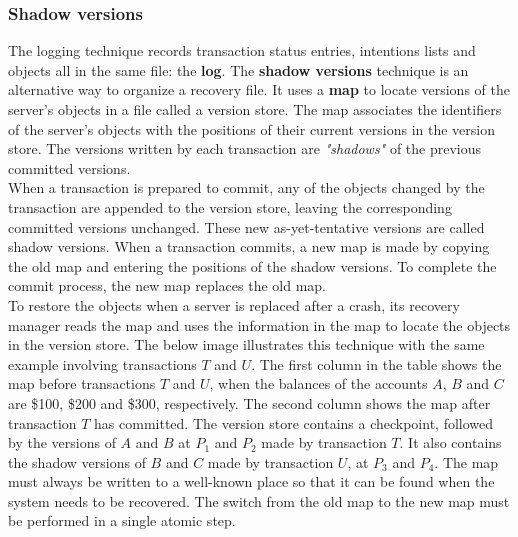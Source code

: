 \subsubsection{Shadow versions}
The logging technique records transaction status entries, intentions lists and objects all in the same file: the \textbf{log}. The \textbf{shadow versions} technique is an alternative way to organize a recovery file. It uses a \textbf{map} to locate versions of the server’s objects in a file called a version store. The map associates the identifiers of the server’s objects with the positions of their current versions in the version store. The versions written by each transaction are \textit{"shadows"} of the previous committed versions.\\
When a transaction is prepared to commit, any of the objects changed by the transaction are appended to the version store, leaving the corresponding committed versions unchanged. These new as-yet-tentative versions are called shadow versions. When a transaction commits, a new map is made by copying the old map and entering the positions of the shadow versions. To complete the commit process, the new map replaces the old map.\\
To restore the objects when a server is replaced after a crash, its recovery manager reads the map and uses the information in the map to locate the objects in the version store. The below image illustrates this technique with the same example involving transactions $T$ and $U$. The first column in the table shows the map before transactions $T$ and $U$, when the balances of the accounts $A$, $B$ and $C$ are \$100, \$200 and \$300, respectively. The second column shows the map after transaction $T$ has committed.
The version store contains a checkpoint, followed by the versions of $A$ and $B$ at $P_1$
and $P_2$ made by transaction $T$. It also contains the shadow versions of $B$ and $C$ made by
transaction $U$, at $P_3$ and $P_4$.
The map must always be written to a well-known place so that it can be found when the system needs to
be recovered. The switch from the old map to the new map must be performed in a single atomic step.

